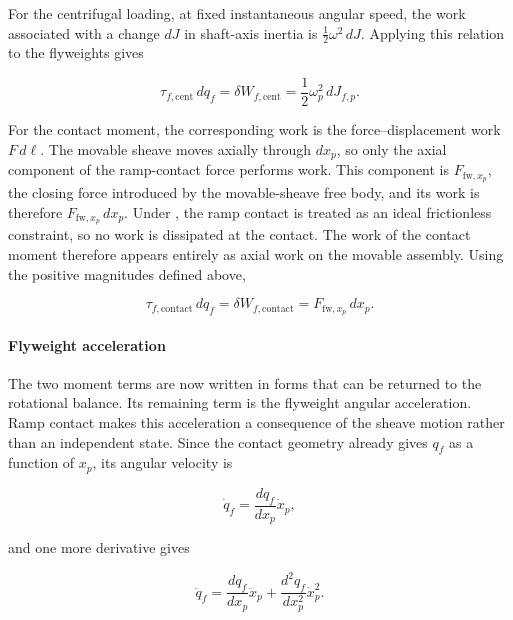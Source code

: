 \documentclass[11pt]{report}
\numberwithin{equation}{section}
\newcounter{assump}
\begin{document}
For the centrifugal loading, at fixed instantaneous angular speed, the work
associated with a change \(dJ\) in shaft-axis inertia is
\(\tfrac{1}{2}\omega^2\,dJ\). Applying this relation to the flyweights gives

\begin{equation}
    \tau_{f,\mathrm{cent}}\,dq_f
    =
    \delta W_{f,\mathrm{cent}}
    =
    \frac{1}{2}\omega_p^2\,dJ_{f,p}.
    \label{eq:primary_centrifugal_work}
\end{equation}

For the contact moment, the corresponding work is the force--displacement
work \(F\,d\ell\). The movable sheave moves axially through \(dx_p\), so only
the axial component of the ramp-contact force performs work. This component
is \(F_{\mathrm{fw},x_p}\), the closing force introduced by the movable-sheave
free body, and its work is therefore \(F_{\mathrm{fw},x_p}\,dx_p\). Under
, the ramp contact is treated as an
ideal frictionless constraint, so no work is dissipated at the contact. The
work of the contact moment therefore appears entirely as axial work on the
movable assembly. Using the positive magnitudes defined above,

\begin{equation}
    \tau_{f,\mathrm{contact}}\,dq_f
    =
    \delta W_{f,\mathrm{contact}}
    =
    F_{\mathrm{fw},x_p}\,dx_p.
    \label{eq:primary_contact_work}
\end{equation}

\paragraph{Flyweight acceleration}

The two moment terms are now written in forms that can be returned to the
rotational balance. Its remaining term is the flyweight angular acceleration.
Ramp contact makes this acceleration a consequence of the sheave motion rather
than an independent state. Since the contact geometry already gives \(q_f\) as
a function of \(x_p\), its angular velocity is

\begin{equation}
    \dot q_f
    =
    \frac{dq_f}{dx_p}\dot x_p,
    \label{eq:primary_flyweight_angular_velocity}
\end{equation}

and one more derivative gives

\begin{equation}
    \ddot q_f
    =
    \frac{dq_f}{dx_p}\ddot x_p
    +
    \frac{d^2q_f}{dx_p^2}\dot x_p^2.
    \label{eq:primary_flyweight_angular_acceleration}
\end{equation}
\end{document}
